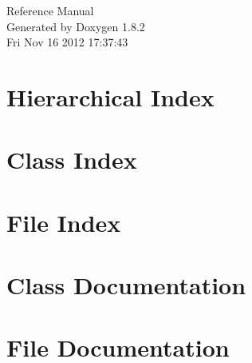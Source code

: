 \documentclass{book}
\begin{document}
\hypersetup{pageanchor=false,citecolor=blue}
\begin{titlepage}
\vspace*{7cm}
\begin{center}
{\Large Reference Manual}\\
\vspace*{1cm}
{\large Generated by Doxygen 1.8.2}\\
\vspace*{0.5cm}
{\small Fri Nov 16 2012 17:37:43}\\
\end{center}
\end{titlepage}
\clearemptydoublepage
{}
\tableofcontents
\clearemptydoublepage
{}
\hypersetup{pageanchor=true,citecolor=blue}
\chapter{Hierarchical Index}

\chapter{Class Index}

\chapter{File Index}

\chapter{Class Documentation}






























\chapter{File Documentation}


\printindex
\end{document}
